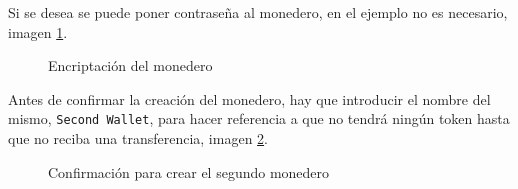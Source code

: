 Si se desea se puede poner contraseña al monedero, en el ejemplo no es necesario, imagen \ref{fig:wallet-16}.

\begin{figure}[H]
	\centering
	\caption{Encriptación del monedero}
	\label{fig:wallet-16}
\end{figure}

\newpage
Antes de confirmar la creación del monedero, hay que introducir el nombre del mismo, \texttt{Second Wallet}, para hacer referencia a que no tendrá ningún token hasta que no reciba una transferencia, imagen \ref{fig:wallet-17}.

\begin{figure}[H]
	\centering
	\caption{Confirmación para crear el segundo monedero}
	\label{fig:wallet-17}
\end{figure}

















